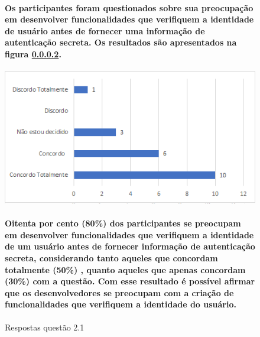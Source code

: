 \begin{figure}[!t]
\centering
\paragraph{Os participantes foram questionados sobre sua preocupação em desenvolver funcionalidades que verifiquem a identidade de usuário antes de fornecer uma informação de autenticação secreta. Os resultados são apresentados na figura \ref{fig:2.1}.
}
\includegraphics[scale=0.7]{figuras das questoes/2.1.png}
\caption{Respostas questão 2.1}
\paragraph{
Oitenta por cento (80{\%}) dos participantes se preocupam em desenvolver funcionalidades que verifiquem a identidade de um usuário antes de fornecer informação de autenticação secreta, considerando tanto aqueles que concordam totalmente (50{\%}) , quanto aqueles que apenas concordam (30{\%}) com a questão. Com esse resultado é possível afirmar que os desenvolvedores se preocupam com a criação de funcionalidades que verifiquem a identidade do usuário.
}
\label{fig:2.1}
\end{figure}
